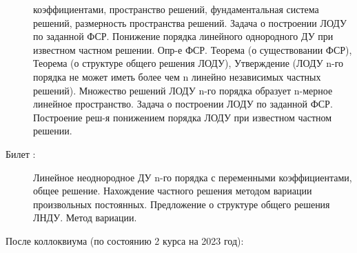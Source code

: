 \documentclass{article}
\newcounter{ticket}[subsection]
\newcounter{Ticket}[subsection]
\newcommand{\Ticket}[1][]{\item[Билет \ifthenelse{\equal{#1}{}}{}{\setcounter{ticket}{#1}}\theticket\refstepcounter{ticket}:]}
\begin{document}
\begin{description}
	коэффициентами, пространство решений, фундаментальная система решений, размерность
	пространства решений. Задача о построении ЛОДУ по заданной ФСР. Понижение порядка линейного
	однородного ДУ при известном частном решении.
	Опр-е ФСР. Теорема (о существовании ФСР), Теорема (о структуре общего решения ЛОДУ), Утверждение
	(ЛОДУ n-го порядка не может иметь более чем n линейно независимых частных решений). Множество
	решений ЛОДУ n-го порядка образует n-мерное линейное пространство. Задача о построении ЛОДУ по
	заданной ФСР. Построение реш-я понижением порядка ЛОДУ при известном частном решении.
	\Ticket Линейное неоднородное ДУ n-го порядка с переменными коэффициентами, общее решение.
	Нахождение частного решения методом вариации произвольных постоянных. Предложение о
	структуре общего решения ЛНДУ. Метод вариации.
\end{description}
После коллоквиума (по состоянию 2 курса на 2023 год):
\end{document}

